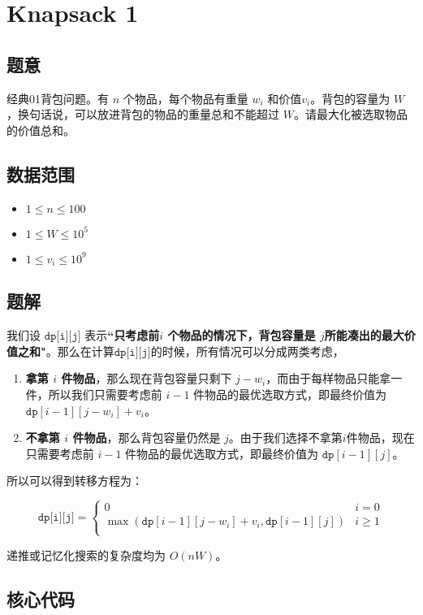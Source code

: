 \section{Knapsack 1}
\subsection*{题意}
经典01背包问题。有 $n$ 个物品，每个物品有重量 $w_i$ 和价值$v_i$。背包的容量为 $W$，换句话说，可以放进背包的物品的重量总和不能超过 $W$。请最大化被选取物品的价值总和。
\subsection*{数据范围}
\begin{itemize}
\item $1 \leq n \leq 100$
\item $1 \leq W \leq 10^5$
\item $1 \leq v_i \leq 10^9$
\end{itemize}
\subsection*{题解}

我们设 \textbf{${\texttt{dp[i][j]}}$} 表示\textbf{``只考虑前$i$ 个物品的情况下，背包容量是 $j$所能凑出的最大价值之和"}。那么在计算${\texttt{dp[i][j]}}$的时候，所有情况可以分成两类考虑，
\begin{enumerate}
    \item \textbf{拿第 $i$ 件物品}，那么现在背包容量只剩下 $j - w_i$，而由于每样物品只能拿一件，所以我们只需要考虑前 $i-1$ 件物品的最优选取方式，即最终价值为 $\texttt{dp}[i-1][j-w_i] + v_i$。
    \item \textbf{不拿第 $i$ 件物品}，那么背包容量仍然是 $j$。由于我们选择不拿第$i$件物品，现在只需要考虑前 $i-1$ 件物品的最优选取方式，即最终价值为 ${\texttt{dp}[i-1][j]}$。
\end{enumerate}

所以可以得到转移方程为：

\begin{equation*}
{\texttt{dp[i][j]}} = 
\begin{cases}
 0 & i = 0\\
\max({\texttt{dp}}[i-1][j-w_i] + v_i,{\texttt{dp}}[i-1][j]) & i \ge 1\\
\end{cases}
\end{equation*}

递推或记忆化搜索的复杂度均为 $O(nW)$。


\subsection*{核心代码}
\inputminted[linenos,autogobble]{cpp}{../Code/D.cpp}
\newpage
